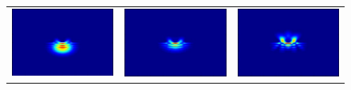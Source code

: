 \begin{figure}[H]
\begin{tabular}{ccc}
  \includegraphics[scale = 0.29]{slit4.png} &   \includegraphics[scale = 0.29]{slit5.png} &   \includegraphics[scale = 0.29]{slit6.png} \\

\end{tabular}
\end{figure}
